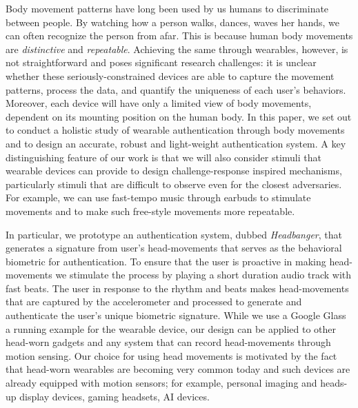 \vspace{1mm} Body movement patterns have long been used by us humans to discriminate between people. By watching how a person walks, dances, waves her hands, we can often recognize the person from afar. This is because human body movements are \emph{distinctive} and \emph{repeatable}.  Achieving the same through wearables, however, is not straightforward and poses significant research challenges: it is unclear whether these seriously-constrained devices are able to capture the movement patterns, process the data, and quantify the uniqueness of each user's behaviors. Moreover, each device will have only a limited view of body movements, dependent on its mounting position on the human body. In this paper, we set out to conduct a holistic study of wearable authentication through body movements and to design an accurate, robust and light-weight authentication system. A key distinguishing feature of our work is that we will also consider stimuli that wearable devices can provide to design challenge-response inspired mechanisms, particularly stimuli that are difficult to observe even for the closest adversaries. For example, we can use fast-tempo music through earbuds to stimulate movements and to make such free-style movements more repeatable. 

In particular, we prototype an authentication system, dubbed {\em Headbanger}, that generates a signature from user's head-movements that serves as the
behavioral biometric for authentication. To ensure that the user is proactive in making head-movements we stimulate the process by playing a short duration
audio track with fast beats. The user in response to the rhythm and beats makes head-movements that are captured by the accelerometer and processed to
generate and authenticate the user's unique biometric signature. While we use a Google Glass a running example for the wearable device, our design can be applied to other head-worn gadgets and any system that can record head-movements through motion sensing. Our choice for using head movements is motivated by the fact that head-worn wearables are becoming very common today and such devices are already equipped with motion sensors; for example, personal imaging and heads-up display devices, gaming headsets, AI devices.


